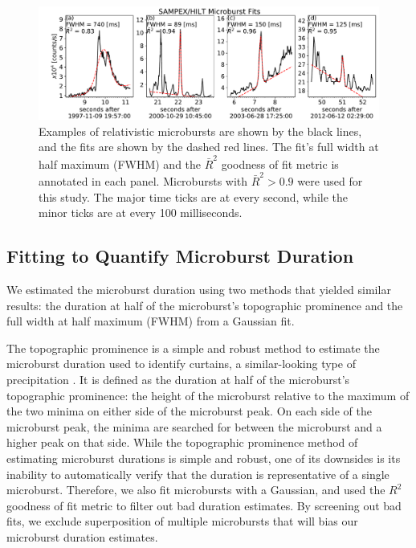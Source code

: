 \documentclass[draft]{agujournal2019}
\begin{document}
\begin{figure}
\noindent\includegraphics[width=\textwidth]{figures/fig1.pdf}
\caption{Examples of relativistic microbursts are shown by the black lines, and the fits are shown by the dashed red lines. The fit's full width at half maximum (FWHM) and the $\bar{R}^2$ goodness of fit metric is annotated in each panel. Microbursts with $\bar{R}^2 > 0.9$ were used for this study. The major time ticks are at every second, while the minor ticks are at every 100 milliseconds.}
\label{fig1}
\end{figure}

\subsection{Fitting to Quantify Microburst Duration}
We estimated the microburst duration using two methods that yielded similar results: the duration at half of the microburst's topographic prominence and the full width at half maximum (FWHM) from a Gaussian fit.

The topographic prominence is a simple and robust method to estimate the microburst duration used to identify curtains, a similar-looking type of precipitation \cite{Shumko2020b}. It is defined as the duration at half of the microburst's topographic prominence: the height of the microburst relative to the maximum of the two minima on either side of the microburst peak. On each side of the microburst peak, the minima are searched for between the microburst and a higher peak on that side. While the topographic prominence method of estimating microburst durations is simple and robust, one of its downsides is its inability to automatically verify that the duration is representative of a single microburst. Therefore, we also fit microbursts with a Gaussian, and used the $R^2$ goodness of fit metric to filter out bad duration estimates. By screening out bad fits, we exclude superposition of multiple microbursts that will bias our microburst duration estimates.
\end{document}
